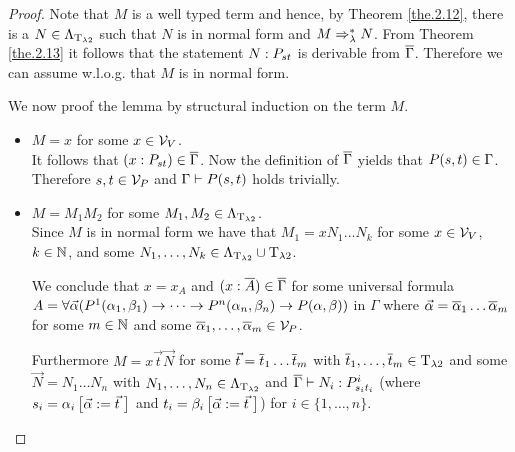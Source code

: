 \begin{proof}
Note that $M$ is a well typed \lambdaTwo{} term and hence, by Theorem \ref{the.2.12}, there is a $N\in\Lambda_{\text{T}_{\lambda2}}$ such that $N$ is in normal form and $M\Rightarrow_\lambda^*N$. From Theorem \ref{the.2.13} it follows that the statement $N:\code{P}{\predTFst}{\predTSnd}$ is derivable from $\overline{\Gamma}$. Therefore we can assume w.l.o.g. that $M$ is in normal form.

We now proof the lemma by structural induction on the term $M$.
\begin{itemize}
	\item[] \underline{$M=x$} for some $x\in\mathcal{V}_V$.\\
		It follows that $(x:\code{P}{\predTFst}{\predTSnd})\in\trans{\Gamma}$.
		Now the definition of $\overline{\Gamma}$ yields that $P(\predTFst,\predTSnd)\in\Gamma$. Therefore $\predTFst,\predTSnd\in\VarP$ and $\Gamma\vdash P(s,t)$ holds trivially.
	\item[] \underline{$M=M_1M_2$} for some $M_1,M_2\in\Lambda_{\text{T}_{\lambda2}}$.\\
		Since $M$ is in normal form we have that $M_1=xN_1\dots N_k$ for some $x\in\mathcal{V}_V$, $k\in\mathbb{N}$, and some $N_1,\dots,N_k\in\Lambda_{\text{T}_{\lambda2}}\cup\text{T}_{\lambda2}$. %
		
		We conclude that $x=x_A$ and $(x:\overline{A})\in\overline{\Gamma}$ for some universal formula $A=\forall\predVec(P^1(\predFst[1],\predSnd[1])\to\dots\to P^n(\predFst[n],\predSnd[n])\to P(\predFst,\predSnd))$ in $\Gamma$ where $\predVec=\predVec[1]\dots\predVec[m]$ for some $m\in\mathbb{N}$ and some $\predVec[1],\dots,\predVec[m]\in\VarP$.
		

		Furthermore $M=x\vec{t}\vec{N}$ for some $\predTVec=\predTVec[1]\dots \predTVec[m]$ with $\predTVec[1],\dots,\predTVec[m]\in\lambdaTypes$ and some $\vec{N}=N_1\dots N_n$ with $N_1,\dots,N_n\in\Lambda_{\text{T}_{\lambda2}}$ and $\trans{\Gamma}\lambdaModels N_i:\code{P^i}{\predTFst[i]}{\predTSnd[i]}$ (where $\predTFst[i]=\predFst[i]\left[\predVec:=\predTVec\hspace{1mm}\right]$ and  $\predTSnd[i]=\predSnd[i]\left[\predVec:=\predTVec\hspace{1mm}\right]$) for $i\in\{1,\dots,n\}$.
		

\end{itemize}
\end{proof}
